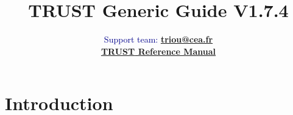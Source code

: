 \documentclass[a4paper,11pt,english]{report}
\newcommand{\trust}{\textbf{TRUST}\xspace}
\begin{document}
\title{\Huge \bfseries{TRUST Generic Guide V1.7.4}}
\author{
\vspace{4cm} %
\LARGE \textcolor{darkblue}{Support team: \textbf{\href{mailto:triou@cea.fr}{triou@cea.fr}}} \\
\vspace{5cm} %
\LARGE \textbf{\href{TRUST_Reference_Manual.pdf}{\trust Reference Manual}}
}

\maketitle
\tableofcontents{}
\newpage





%
\chapter{Introduction}
%

\end{document}
